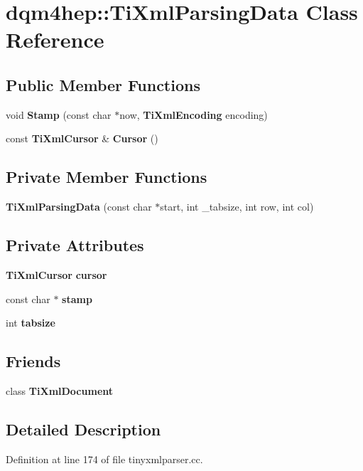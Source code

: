 \section{dqm4hep\+:\+:Ti\+Xml\+Parsing\+Data Class Reference}
\label{classdqm4hep_1_1TiXmlParsingData}
\subsection*{Public Member Functions}
\begin{DoxyCompactItemize}
\item 
void {\bf Stamp} (const char $\ast$now, {\bf Ti\+Xml\+Encoding} encoding)
\item 
const {\bf Ti\+Xml\+Cursor} \& {\bf Cursor} ()
\end{DoxyCompactItemize}
\subsection*{Private Member Functions}
\begin{DoxyCompactItemize}
\item 
{\bf Ti\+Xml\+Parsing\+Data} (const char $\ast$start, int \+\_\+tabsize, int row, int col)
\end{DoxyCompactItemize}
\subsection*{Private Attributes}
\begin{DoxyCompactItemize}
\item 
{\bf Ti\+Xml\+Cursor} {\bf cursor}
\item 
const char $\ast$ {\bf stamp}
\item 
int {\bf tabsize}
\end{DoxyCompactItemize}
\subsection*{Friends}
\begin{DoxyCompactItemize}
\item 
class {\bf Ti\+Xml\+Document}
\end{DoxyCompactItemize}


\subsection{Detailed Description}


Definition at line 174 of file tinyxmlparser.\+cc.



